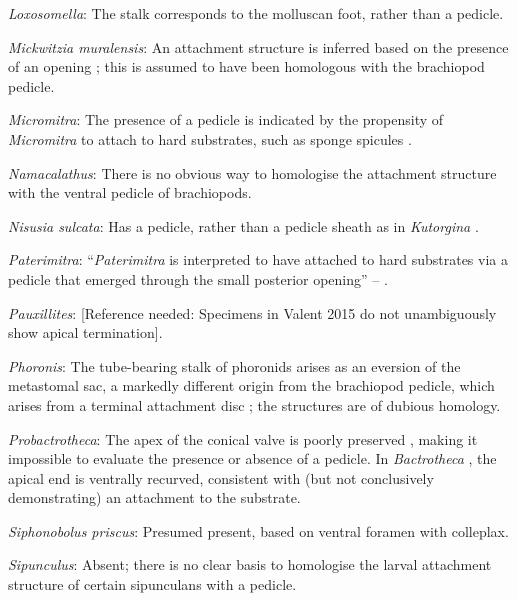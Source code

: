\documentclass[openany]{book}
\theoremstyle{definition}
\theoremstyle{definition}
\theoremstyle{definition}
\theoremstyle{remark}
\begin{document}
\hypertarget{Loxosomella-coding-24}{}
\emph{Loxosomella}: The stalk corresponds to the molluscan foot, rather
than a pedicle.

\hypertarget{Mickwitzia_muralensis-coding-24}{}
\emph{Mickwitzia muralensis}: An attachment structure is inferred based
on the presence of an opening \citep{Balthasar2004Shellstructure}; this
is assumed to have been homologous with the brachiopod pedicle.

\hypertarget{Micromitra-coding-24}{}
\emph{Micromitra}: The presence of a pedicle is indicated by the
propensity of \emph{Micromitra} to attach to hard substrates, such as
sponge spicules \citep{Holmer2006Aspinose}.

\hypertarget{Namacalathus-coding-24}{}
\emph{Namacalathus}: There is no obvious way to homologise the
attachment structure with the ventral pedicle of brachiopods.

\hypertarget{Nisusia_sulcata-coding-24}{}
\emph{Nisusia sulcata}: Has a pedicle, rather than a pedicle sheath as
in \emph{Kutorgina}
\citep{Holmer2018Evolutionarysignificance, Holmer2018Theattachment}.

\hypertarget{Paterimitra-coding-24}{}
\emph{Paterimitra}: ``\emph{Paterimitra} is interpreted to have attached
to hard substrates via a pedicle that emerged through the small
posterior opening'' -- \citet{Skovsted2009Thescleritome}.

\hypertarget{Pauxillites-coding-24}{}
\emph{Pauxillites}: {[}Reference needed: Specimens in Valent 2015 do not
unambiguously show apical termination{]}.

\hypertarget{Phoronis-coding-24}{}
\emph{Phoronis}: The tube-bearing stalk of phoronids arises as an
eversion of the metastomal sac, a markedly different origin from the
brachiopod pedicle, which arises from a terminal attachment disc
\citep{Young2002}; the structures are of dubious homology.

\hypertarget{Probactrotheca-coding-24}{}
\emph{Probactrotheca}: The apex of the conical valve is poorly preserved
\citep{Valent2012}, making it impossible to evaluate the presence or
absence of a pedicle. In \emph{Bactrotheca} \citep{Dzik1980Ontogenyof},
the apical end is ventrally recurved, consistent with (but not
conclusively demonstrating) an attachment to the substrate.

\hypertarget{Siphonobolus_priscus-coding-24}{}
\emph{Siphonobolus priscus}: Presumed present, based on ventral foramen
with colleplax.

\hypertarget{Sipunculus-coding-24}{}
\emph{Sipunculus}: Absent; there is no clear basis to homologise the
larval attachment structure of certain sipunculans with a pedicle.
\end{document}
